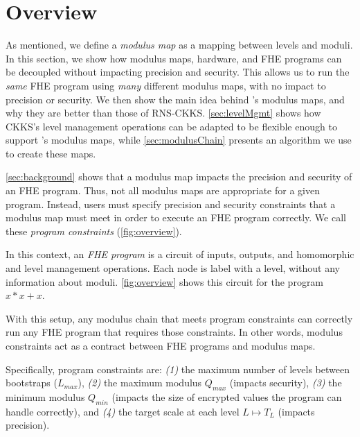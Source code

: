 
\section{Overview}
\label{sec:overview}

As mentioned, we define a \emph{modulus map} as a mapping between levels and
moduli.
In this section, we show how modulus maps, hardware, and FHE programs can be
decoupled without impacting precision and security.
This allows us to run the \emph{same} FHE program using \emph{many} different
modulus maps, with no impact to precision or security.
We then show the main idea behind \name's modulus maps, and why they are better
than those of RNS-CKKS.
\autoref{sec:levelMgmt} shows how CKKS's level management operations can be
adapted to be flexible enough to support \name's modulus maps, while
\autoref{sec:modulusChain} presents an algorithm we use to create these maps.

\figOverview

\autoref{sec:background} shows that a modulus map impacts the precision
and security of an FHE program. Thus, not all modulus maps are appropriate
for a given program.
Instead, users must specify precision and security constraints that a modulus
map must meet in order to execute an FHE program correctly. We call these
\emph{program constraints} (\autoref{fig:overview}).

In this context, an \emph{FHE program} is a circuit of inputs, outputs, and
homomorphic and level management operations. Each node is label with a level,
without any information about moduli. \autoref{fig:overview} shows this circuit
for the program $x \ast x + x$.

With this setup, any modulus chain that meets program constraints can correctly
run any FHE program that requires those constraints. In other words,
modulus constraints act as a contract between FHE programs and modulus maps.

Specifically, program constraints are:
\emph{(1)} the maximum number of levels between bootstraps ($L_{max}$),
\emph{(2)} the maximum modulus $Q_{max}$ (impacts security),
\emph{(3)} the minimum modulus $Q_{min}$ (impacts the size of encrypted values
the program can handle correctly), and
\emph{(4)} the target scale at each level $L \mapsto T_L$ (impacts precision).

